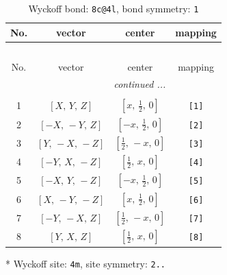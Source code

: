 \documentclass[fleqn,8pt]{jsarticle}
\begin{document}
\renewcommand{\arraystretch}{1.2}
\begin{longtable}{cccc}
\caption{Wyckoff bond: {\tt 8c@4l}, bond symmetry: {\tt 1}}
 \\
 \hline \hline
No. & vector & center & mapping \\ \hline \endfirsthead

\multicolumn{3}{l}{\tablename\ \thetable{}} \\
 \hline \hline
No. & vector & center & mapping \\ \hline \endhead

 \hline \hline
\multicolumn{3}{r}{\footnotesize\it continued ...} \\ \endfoot

 \hline \hline
\multicolumn{3}{r}{} \\ \endlastfoot

1 & $\left[ X,\, Y,\, Z \right]$ & $\left[ x,\, \frac{1}{2},\, 0 \right]$ & {\tt [1]} \\ \hline
2 & $\left[ - X,\, - Y,\, Z \right]$ & $\left[ - x,\, \frac{1}{2},\, 0 \right]$ & {\tt [2]} \\ \hline
3 & $\left[ Y,\, - X,\, - Z \right]$ & $\left[ \frac{1}{2},\, - x,\, 0 \right]$ & {\tt [3]} \\ \hline
4 & $\left[ - Y,\, X,\, - Z \right]$ & $\left[ \frac{1}{2},\, x,\, 0 \right]$ & {\tt [4]} \\ \hline
5 & $\left[ - X,\, Y,\, - Z \right]$ & $\left[ - x,\, \frac{1}{2},\, 0 \right]$ & {\tt [5]} \\ \hline
6 & $\left[ X,\, - Y,\, - Z \right]$ & $\left[ x,\, \frac{1}{2},\, 0 \right]$ & {\tt [6]} \\ \hline
7 & $\left[ - Y,\, - X,\, Z \right]$ & $\left[ \frac{1}{2},\, - x,\, 0 \right]$ & {\tt [7]} \\ \hline
8 & $\left[ Y,\, X,\, Z \right]$ & $\left[ \frac{1}{2},\, x,\, 0 \right]$ & {\tt [8]} \\
\end{longtable}
* Wyckoff site: {\tt 4m}, site symmetry: {\tt 2..}
\renewcommand{\arraystretch}{1.2}
\end{document}
